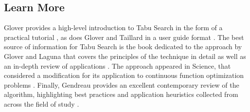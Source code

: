% 
% 
\subsection{Learn More}
Glover provides a high-level introduction to Tabu Search in the form of a practical tutorial \cite{Glover1990a}, as does Glover and Taillard in a user guide format \cite{Glover1993}. 
The best source of information for Tabu Search is the book dedicated to the approach by Glover and Laguna that covers the principles of the technique in detail as well as an in-depth review of applications \cite{Glover1998}.
The approach appeared in Science, that considered a modification for its application to continuous function optimization problems \cite{Cvijovic1995}. Finally, Gendreau provides an excellent contemporary review of the algorithm, highlighting best practices and application heuristics collected from across the field of study \cite{Gendreau2003}.


